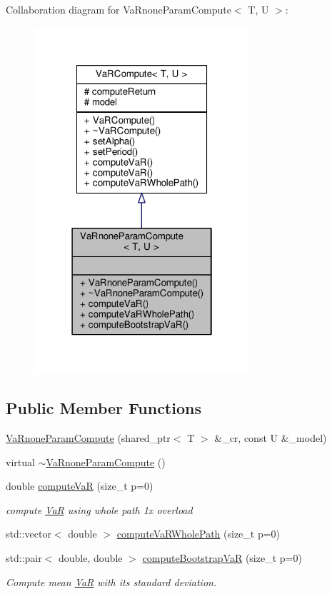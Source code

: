 Collaboration diagram for Va\+Rnone\+Param\+Compute$<$ T, U $>$\+:
\nopagebreak
\begin{figure}[H]
\begin{center}
\leavevmode
\includegraphics[width=226pt]{classVaRnoneParamCompute__coll__graph}
\end{center}
\end{figure}
\subsection*{Public Member Functions}
\begin{DoxyCompactItemize}
\item 
\hyperlink{classVaRnoneParamCompute_a777937a68e65b95336aa2b521619f2d9}{Va\+Rnone\+Param\+Compute} (shared\+\_\+ptr$<$ T $>$ \&\+\_\+cr, const U \&\+\_\+model)
\item 
virtual \hyperlink{classVaRnoneParamCompute_a4b761cc6ae89bf341533dc48e13d63de}{$\sim$\+Va\+Rnone\+Param\+Compute} ()
\item 
double \hyperlink{classVaRnoneParamCompute_a171ea43cd1a1a9a38cf415c22e06898a}{compute\+VaR} (size\+\_\+t p=0)
\begin{DoxyCompactList}\small\item\em compute \hyperlink{classVaR}{VaR} using whole path 1x overload \end{DoxyCompactList}\item 
std\+::vector$<$ double $>$ \hyperlink{classVaRnoneParamCompute_a7ddfb62c4e1e9890542818c75c51798e}{compute\+Va\+R\+Whole\+Path} (size\+\_\+t p=0)
\item 
std\+::pair$<$ double, double $>$ \hyperlink{classVaRnoneParamCompute_ad1c8f84e6efd21924d24258bc5ac3933}{compute\+Bootstrap\+VaR} (size\+\_\+t p=0)
\begin{DoxyCompactList}\small\item\em Compute mean \hyperlink{classVaR}{VaR} with its standard deviation. \end{DoxyCompactList}\end{DoxyCompactItemize}
